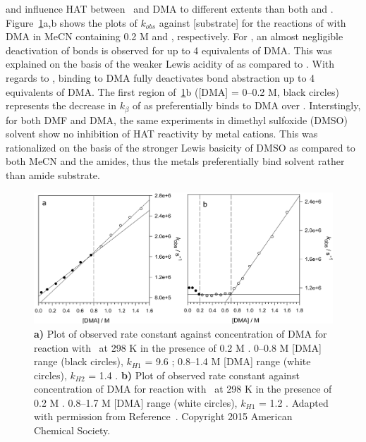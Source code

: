  and  influence HAT between \cumo\ and DMA to different extents than both  and . Figure~\ref{fig:k-metals-naca}a,b shows the plots of $k_{obs}$ against [substrate] for the reactions of \cumo with DMA in MeCN containing 0.2 M  and , respectively. For , an almost negligible deactivation of  bonds is observed for up to 4 equivalents of DMA. This was explained on the basis of the weaker Lewis acidity of  as compared to . With regards to , binding to DMA fully deactivates  bond abstraction up to 4 equivalents of DMA. The first region of~\ref{fig:k-metals-naca}b ([DMA] = 0--0.2 M, black circles) represents the decrease in $k_\beta$ of \cumo as  preferentially binds to DMA over \cumo. Interstingly, for both DMF and DMA, the same experiments in dimethyl sulfoxide (DMSO) solvent show no inhibition of HAT reactivity by metal cations. This was rationalized on the basis of the stronger Lewis basicity of DMSO as compared to both MeCN and the amides, thus the metals preferentially bind solvent rather than amide substrate.

\begin{figure}[!htbp]
  \includegraphics[width=\textwidth]{figures/exptdma-na-ca.png}
  \caption[Plot of observed rate constant against concentration of DMA for reaction with \cumo\ at 298 K in the presence of 0.2 M  and .]
  {\textbf{a)} Plot of observed rate constant against concentration of DMA for reaction with \cumo\ at 298 K in the presence of 0.2 M . 0--0.8 M [DMA] range (black circles), $k_{H1}$ = 9.6 \Ms; 0.8--1.4 M [DMA] range (white circles), $k_{H2}$ = 1.4 \Ms.
  \textbf{b)} Plot of observed rate constant against concentration of DMA for reaction with \cumo\ at 298 K in the presence of 0.2 M . 0.8--1.7 M [DMA] range (white circles), $k_{H1}$ = 1.2 \Ms. Adapted with permission from Reference~\protect{}. Copyright 2015 American Chemical Society.}
  \label{fig:k-metals-naca}
\end{figure}

